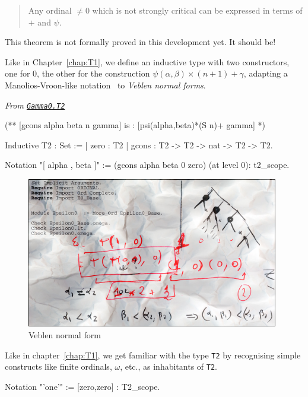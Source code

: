 {\begin{quote}
  Any ordinal $\not= 0$ which is not strongly critical can be expressed in terms of $+$ and $\psi$.
\end{quote}

\begin{project}
This theorem is not formally proved in this development yet. It should be!
\end{project}


Like in Chapter~\ref{chap:T1}, we define an inductive type with two constructors, one for $0$, the other for the construction $\psi(\alpha,\beta)\times(n+1)+\gamma$, adapting a Manolios-Vroon-like notation~\cite{Manolios2005} to
\emph{Veblen normal forms}.
\label{types:T2}

\noindent\emph{From \href{../theories/html/hydras.Gamma0.T2.html\#T2}%
{\texttt{Gamma0.T2}}}
\begin{Coqsrc}
(**  [gcons alpha beta n gamma] is : [psi(alpha,beta)*(S n)+ gamma]  *)

Inductive T2 : Set :=
| zero : T2
| gcons : T2 -> T2  -> nat -> T2 -> T2.

Notation "[ alpha , beta ]" := (gcons alpha beta 0 zero)
                                 (at level 0): t2_scope.
\end{Coqsrc}

\begin{figure}[h]
  \centering
  \includegraphics[width=11cm]{epsilon0.jpg}
  \caption{Veblen normal form}
  \label{fig:gamma0}
\end{figure}

Like in chapter~\ref{chap:T1}, we get familiar with the type \texttt{T2} by recognising simple constructs like finite ordinals, $\omega$, etc., as inhabitants of \texttt{T2}.

\begin{Coqsrc}
Notation  "'one'"  := [zero,zero] : T2_scope.


\end{Coqsrc}}
